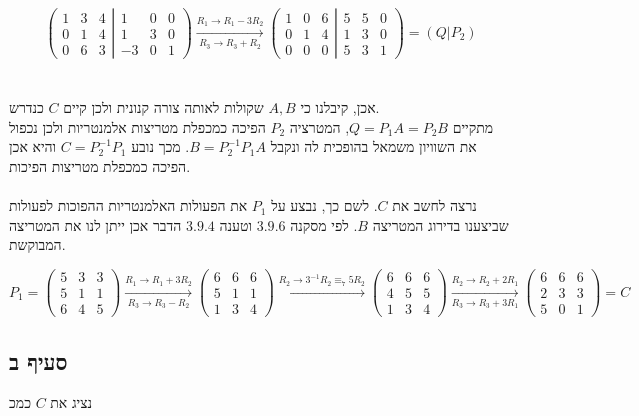 \documentclass{article}
\begin{document}
\[
    \left(
    \begin{matrix}
            1 & 3 & 4 \\
            0 & 1 & 4 \\
            0 & 6 & 3
        \end{matrix}
    \left|
    \begin{matrix}
            1  & 0 & 0 \\
            1  & 3 & 0 \\
            -3 & 0 & 1
        \end{matrix}
    \right.
    \right)
    \xrightarrow[R_3\rightarrow R_3+R_2]{R_1\rightarrow R_1-3R_2}
    \left(
    \begin{matrix}
            1 & 0 & 6 \\
            0 & 1 & 4 \\
            0 & 0 & 0
        \end{matrix}
    \left|
    \begin{matrix}
            5 & 5 & 0 \\
            1 & 3 & 0 \\
            5 & 3 & 1
        \end{matrix}
    \right.
    \right) =
    (Q | P_2)
\]
\\\\
אכן, קיבלנו כי $A, B$
שקולות לאותה צורה קנונית ולכן קיים $C$ כנדרש.\\
מתקיים $Q=P_1A=P_2B$,
המטרציה $P_2$
הפיכה כמכפלת מטריצות אלמנטריות ולכן נכפול את השוויון משמאל בהופכית לה ונקבל $B=P_2^{-1}P_1A$.
מכך נובע $C=P^{-1}_2P_1$ והיא אכן הפיכה כמכפלת מטריצות הפיכות.
\\\\
נרצה לחשב את $C$.
לשם כך, נבצע על $P_1$
את הפעולות האלמנטריות ההפוכות לפעולות שביצענו בדירוג המטריצה $B$.
לפי מסקנה $3.9.6$
וטענה $3.9.4$ הדבר אכן ייתן לנו את המטריצה המבוקשת.

\[
    P_1 =
    \begin{pmatrix}
        5 & 3 & 3 \\
        5 & 1 & 1 \\
        6 & 4 & 5
    \end{pmatrix}
    \xrightarrow[R_3\rightarrow R_3-R_2]{R_1\rightarrow R_1+3R_2}
    \begin{pmatrix}
        6 & 6 & 6 \\
        5 & 1 & 1 \\
        1 & 3 & 4
    \end{pmatrix}
    \xrightarrow{R_2\rightarrow 3^{-1}R_2\equiv_7 5R_2}
    \begin{pmatrix}
        6 & 6 & 6 \\
        4 & 5 & 5 \\
        1 & 3 & 4
    \end{pmatrix}
    \xrightarrow[R_3\rightarrow R_3+3R_1]{R_2\rightarrow R_2+2R_1}
    \begin{pmatrix}
        6 & 6 & 6 \\
        2 & 3 & 3 \\
        5 & 0 & 1
    \end{pmatrix} =
    C
\]

\subsection*{סעיף ב}

נציג את $C$ כמכ
\end{document}
